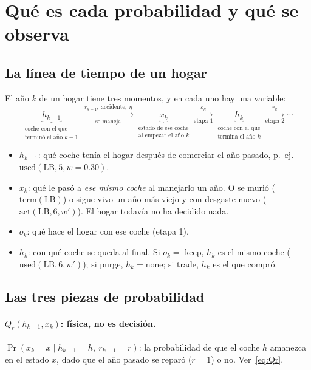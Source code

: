 \documentclass[11pt]{article}
\newcommand{\act}{\mathrm{act}}
\newcommand{\term}{\mathrm{term}}
\newcommand{\none}{\mathrm{none}}
\newcommand{\used}{\mathrm{used}}
\newcommand{\1}{\mathbf{1}}
\begin{document}
\section{Qué es cada probabilidad y qué se observa}\label{sec:lectura}

\subsection{La línea de tiempo de un hogar}

El año $k$ de un hogar tiene tres momentos, y en cada uno hay una variable:
\[
  \underbrace{h_{k-1}}_{\substack{\text{coche con el que}\\\text{terminó el año } k-1}}
  \xrightarrow[\text{se maneja}]{\;r_{k-1},\ \text{accidente},\ \eta\;}
  \underbrace{x_k}_{\substack{\text{estado de ese coche}\\\text{al empezar el año } k}}
  \xrightarrow[\text{etapa 1}]{\;o_k\;}
  \underbrace{h_k}_{\substack{\text{coche con el que}\\\text{termina el año } k}}
  \xrightarrow[\text{etapa 2}]{\;r_k\;}\cdots
\]
\begin{itemize}
  \item $h_{k-1}$: qué coche tenía el hogar después de comerciar el año pasado, p.~ej.
  $\used(\text{LB},5,w=0.30)$.
  \item $x_k$: qué le pasó a \emph{ese mismo coche} al manejarlo un año. O se murió
  ($\term(\text{LB})$) o sigue vivo un año más viejo y con desgaste nuevo
  ($\act(\text{LB},6,w')$). El hogar todavía no ha decidido nada.
  \item $o_k$: qué hace el hogar con ese coche (etapa 1).
  \item $h_k$: con qué coche se queda al final. Si $o_k=$ keep, $h_k$ es el mismo coche
  ($\used(\text{LB},6,w')$); si purge, $h_k=\none$; si trade, $h_k$ es el que compró.
\end{itemize}

\subsection{Las tres piezas de probabilidad}

\paragraph{$Q_r(h_{k-1},x_k)$: física, no es decisión.}
$\Pr(x_k=x\mid h_{k-1}=h,\ r_{k-1}=r)$: la probabilidad de que el coche $h$ amanezca en el
estado $x$, dado que el año pasado se reparó ($r=1$) o no. Ver~\eqref{eq:Qr}.
\end{document}
